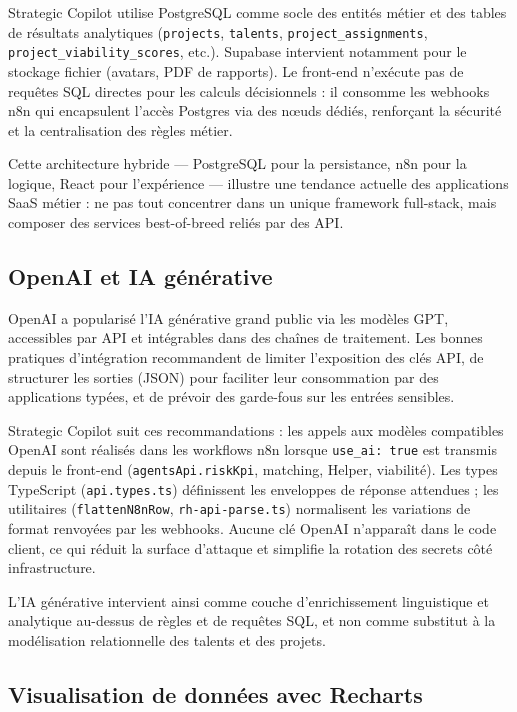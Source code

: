 Strategic Copilot utilise PostgreSQL comme socle des entités métier et des tables de résultats analytiques (\texttt{projects}, \texttt{talents}, \texttt{project\_assignments}, \texttt{project\_viability\_scores}, etc.). Supabase intervient notamment pour le stockage fichier (avatars, PDF de rapports). Le front-end n'exécute pas de requêtes SQL directes pour les calculs décisionnels : il consomme les webhooks n8n qui encapsulent l'accès Postgres via des nœuds dédiés, renforçant la sécurité et la centralisation des règles métier.

Cette architecture hybride --- PostgreSQL pour la persistance, n8n pour la logique, React pour l'expérience --- illustre une tendance actuelle des applications SaaS métier : ne pas tout concentrer dans un unique framework full-stack, mais composer des services best-of-breed reliés par des API.

\subsection{OpenAI et IA générative}

OpenAI a popularisé l'IA générative grand public via les modèles GPT, accessibles par API et intégrables dans des chaînes de traitement. Les bonnes pratiques d'intégration recommandent de limiter l'exposition des clés API, de structurer les sorties (JSON) pour faciliter leur consommation par des applications typées, et de prévoir des garde-fous sur les entrées sensibles.

Strategic Copilot suit ces recommandations : les appels aux modèles compatibles OpenAI sont réalisés dans les workflows n8n lorsque \texttt{use\_ai: true} est transmis depuis le front-end (\texttt{agentsApi.riskKpi}, matching, Helper, viabilité). Les types TypeScript (\texttt{api.types.ts}) définissent les enveloppes de réponse attendues ; les utilitaires (\texttt{flattenN8nRow}, \texttt{rh-api-parse.ts}) normalisent les variations de format renvoyées par les webhooks. Aucune clé OpenAI n'apparaît dans le code client, ce qui réduit la surface d'attaque et simplifie la rotation des secrets côté infrastructure.

L'IA générative intervient ainsi comme couche d'enrichissement linguistique et analytique au-dessus de règles et de requêtes SQL, et non comme substitut à la modélisation relationnelle des talents et des projets.

\subsection{Visualisation de données avec Recharts}

